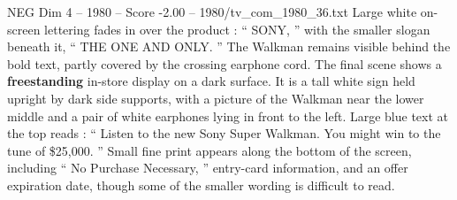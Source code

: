 \begin{textsample}{NEG Dim 4 – 1980 – Score -2.00 – 1980/tv\_com\_1980\_36.txt}
Large white on-screen lettering fades in over the product : “ SONY, ” with the smaller slogan beneath it, “ THE ONE AND ONLY. ” The Walkman remains visible behind the bold text, partly covered by the crossing earphone cord.
The final scene shows a \textbf{freestanding} in-store display on a dark surface.
It is a tall white sign held upright by dark side supports, with a picture of the Walkman near the lower middle and a pair of white earphones lying in front to the left.
Large blue text at the top reads : “ Listen to the new Sony Super Walkman.
You might win to the tune of \$25,000. ” Small fine print appears along the bottom of the screen, including “ No Purchase Necessary, ” entry-card information, and an offer expiration date, though some of the smaller wording is difficult to read.

\end{textsample}
